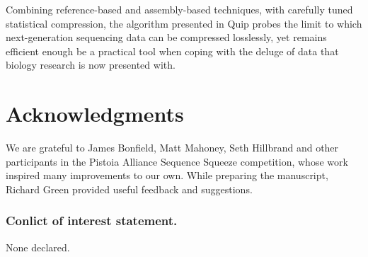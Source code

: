 \documentclass[a4,center,fleqn]{NAR}
\begin{document}
Combining reference-based and assembly-based techniques, with carefully tuned
statistical compression, the algorithm presented in Quip probes the limit to
which next-generation sequencing data can be compressed losslessly, yet
remains efficient enough be a practical tool when coping with the deluge of
data that biology research is now presented with.

\section{Acknowledgments}

We are grateful to James Bonfield, Matt Mahoney, Seth Hillbrand and other
participants in the Pistoia Alliance Sequence Squeeze competition, whose work
inspired many improvements to our own. While preparing the manuscript, Richard
Green provided useful feedback and suggestions.

\subsubsection{Conlict of interest statement.} None declared.
\newpage



\end{document}
